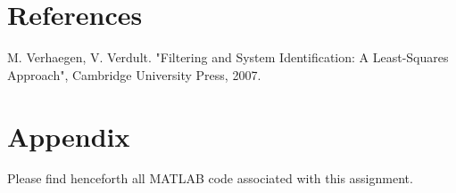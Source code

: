 \documentclass[12pt]{report}
\begin{document}
\newpage
\section*{References}


M. Verhaegen, V. Verdult. "Filtering and System Identification: A Least-Squares Approach", Cambridge University Press, 2007.

\section*{Appendix}

Please find henceforth all MATLAB code associated with this assignment.
\end{document}
